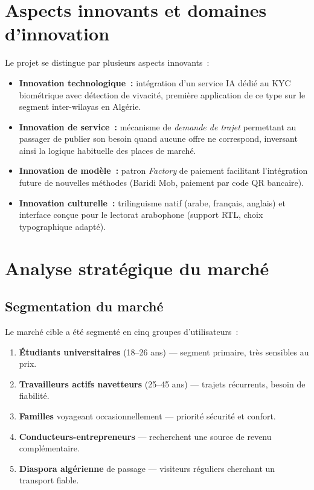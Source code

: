 \documentclass[12pt, a4paper, oneside]{report}
\begin{document}
\section{Aspects innovants et domaines d'innovation}

Le projet se distingue par plusieurs aspects innovants~:
\begin{itemize}
  \item \textbf{Innovation technologique~:} intégration d'un service IA dédié au KYC biométrique avec détection de vivacité, première application de ce type sur le segment inter-wilayas en Algérie.
  \item \textbf{Innovation de service~:} mécanisme de \textit{demande de trajet} permettant au passager de publier son besoin quand aucune offre ne correspond, inversant ainsi la logique habituelle des places de marché.
  \item \textbf{Innovation de modèle~:} patron \textit{Factory} de paiement facilitant l'intégration future de nouvelles méthodes (Baridi Mob, paiement par code QR bancaire).
  \item \textbf{Innovation culturelle~:} trilinguisme natif (arabe, français, anglais) et interface conçue pour le lectorat arabophone (support RTL, choix typographique adapté).
\end{itemize}

\section{Analyse stratégique du marché}

\subsection{Segmentation du marché}

Le marché cible a été segmenté en cinq groupes d'utilisateurs~:
\begin{enumerate}
  \item \textbf{Étudiants universitaires} (18--26 ans) --- segment primaire, très sensibles au prix.
  \item \textbf{Travailleurs actifs navetteurs} (25--45 ans) --- trajets récurrents, besoin de fiabilité.
  \item \textbf{Familles} voyageant occasionnellement --- priorité sécurité et confort.
  \item \textbf{Conducteurs-entrepreneurs} --- recherchent une source de revenu complémentaire.
  \item \textbf{Diaspora algérienne} de passage --- visiteurs réguliers cherchant un transport fiable.
\end{enumerate}
\end{document}
